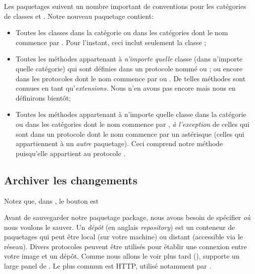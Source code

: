 \documentclass[a4paper,10pt,twoside]{book}
\begin{document}
Les paquetages \MC suivent un nombre important de conventions pour les
catégories de classes et . %
Notre nouveau paquetage  contient:

\begin{itemize}

\item Toutes les classes dans la catégorie  ou dans les
  catégories dont le nom commence par . 
Pour l'instant, ceci inclut seulement la classe
; 

\item Toutes les méthodes appartenant à \emph{n'importe quelle} classe
  (dans n'importe quelle catégorie) qui sont définies dans un
  protocole nommé  ou ; ou encore dans
  les protocoles dont le nom commence par   ou
  .
De telles méthodes sont connues en tant qu'\emph{extensions}. 
Nous n'en avons pas encore mais nous en définirons bientôt;

\item Toutes les méthodes appartenant à n'importe quelle classe dans
  la catégorie  ou dans les catégories dont le nom
  commence par , \emph{à l'exception} de celles 
qui sont dans un protocole dont le nom commence par un astérisque 
 \prot{*} (\ie celles qui appartiennent à un \emph{autre} paquetage).
Ceci comprend notre méthode  puisqu'elle appartient au
protocole .

\end{itemize}

\subsection{Archiver les changements}


Notez que, dans 
, le bouton  est 

Avant de sauvegarder notre paquetage
  package, nous avons besoin de spécifier \emph{où} nous
 voulons le sauver. Un \emph{dépôt} (en anglais \emph{repository}) est
 un conteneur de paquetages qui peut être local (sur votre machine) ou
 distant (accessible via le réseau).
Divers protocoles peuvent être utilisés pour établir une connexion
entre votre image \pharo et un dépôt. Comme nous allons le voir plus
tard (), \MC supporte un large panel de
. Le plus commun est HTTP, utilisé
notamment par \sqsrc. 
\end{document}
